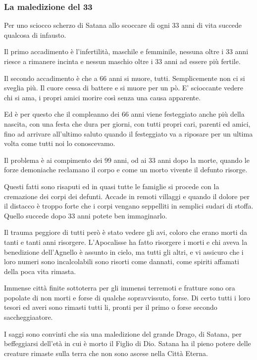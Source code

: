 \documentclass[12pt,a4paper,twoside,openany]{book}
\begin{document}
\begin{multicols}{2}
\subsubsection{La maledizione del 33}

Per uno sciocco scherzo di Satana allo scoccare di ogni 33 anni di vita succede qualcosa di infausto. 

Il primo accadimento è l'infertilità, maschile e femminile, nessuna oltre i 33 anni riesce a rimanere incinta e nessun maschio oltre i 33 anni ad essere più fertile.

Il secondo accadimento è che a 66 anni si muore, tutti. Semplicemente non ci si sveglia più. Il cuore cessa di battere e si muore per un pò.
E' scioccante vedere chi si ama, i propri amici morire così senza una causa apparente.

Ed è per questo che il compleanno dei 66 anni viene festeggiato anche più della nascita, con una festa che dura per giorni, con tutti propri cari, parenti ed amici, fino ad arrivare all'ultimo saluto quando il festeggiato va a riposare per un ultima volta come tutti noi lo conoscevamo.

Il problema è ai compimento dei 99 anni, od ai 33 anni dopo la morte, quando le forze demoniache reclamano il corpo e come un morto vivente il defunto risorge.

Questi fatti sono risaputi ed in quasi tutte le famiglie si procede con la cremazione dei corpi dei defunti. Accade in remoti villaggi e quando il dolore per il distacco è troppo forte che i corpi vengano seppelliti in semplici sudari di stoffa. Quello succede dopo 33 anni potete ben immaginarlo.

Il trauma peggiore di tutti però è stato vedere gli avi, coloro che erano morti da tanti e tanti anni risorgere. L'Apocalisse ha fatto risorgere i morti e chi aveva la benedizione dell'Agnello è assunto in cielo, ma tutti gli altri, e vi assicuro che i loro numeri sono incalcolabili sono risorti come dannati, come spiriti affamati della poca vita rimasta.

Immense città finite sottoterra per gli immensi terremoti e fratture sono ora popolate di non morti e forse di qualche sopravvissuto, forse. Di certo tutti i loro tesori ed averi sono rimasti tutti li, pronti per il primo o forse secondo saccheggiaatore.

I saggi sono convinti che sia una maledizione del grande Drago, di Satana, per beffeggiarsi dell'età in cui è morto il Figlio di Dio. 
Satana ha il pieno potere delle creature rimaste sulla terra che non sono ascese nella Città Eterna.


\end{multicols}
\end{document}
